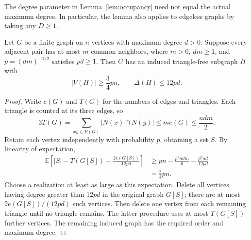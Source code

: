 The degree parameter in Lemma~\ref{lem:occupancy} need not equal the
actual maximum degree.  In particular, the lemma also applies to
edgeless graphs by taking any $D\ge1$.

\begin{lemma}\label{lem:sample-triangle-free}
Let $G$ be a finite graph on $n$ vertices with maximum degree $d>0$.
Suppose every adjacent pair has at most $m$ common neighbors, where
$m>0$, $dm\ge1$, and $p=(dm)^{-1/2}$ satisfies $pd\ge1$.
Then $G$ has an induced triangle-free subgraph $H$ with
\[
 |V(H)|\ge\frac34pn,
 \qquad \Delta(H)\le12pd.
\]
\end{lemma}

\begin{proof}
Write $e(G)$ and $T(G)$ for the numbers of edges and triangles.
Each triangle is counted at its three edges, so
\[
 3T(G)=\sum_{xy\in E(G)}|N(x)\cap N(y)|
 \le me(G)\le\frac{ndm}{2}.
\]
Retain each vertex independently with probability $p$, obtaining a set
$S$.  By linearity of expectation,
\begin{align*}
 \mathbb E\left[|S|-T(G[S])-\frac{2e(G[S])}{12pd}\right]
 &\ge pn-\frac{p^3ndm}{6}-\frac{p^2nd}{12pd}\\
 &=\frac34pn.
\end{align*}
Choose a realization at least as large as this expectation.  Delete all
vertices having degree greater than $12pd$ in the original graph
$G[S]$; there are at most $2e(G[S])/(12pd)$ such vertices.  Then delete
one vertex from each remaining triangle until no triangle remains.
The latter procedure uses at most $T(G[S])$ further vertices.
The remaining induced graph has the required order and maximum degree.
\end{proof}

